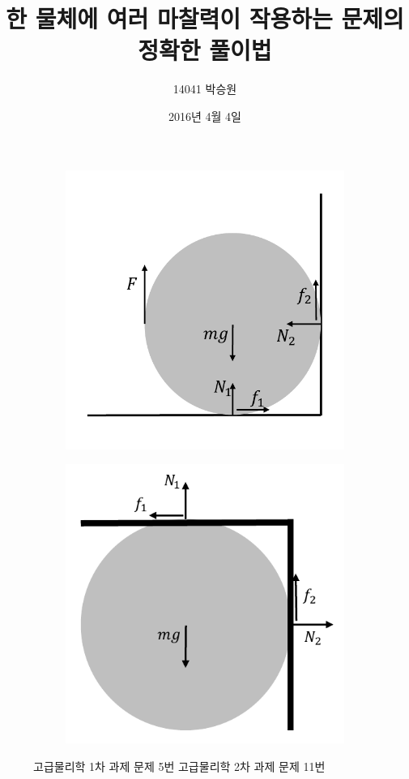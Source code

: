 \documentclass[11pt]{article}
\title{한 물체에 여러 마찰력이 작용하는 문제의 정확한 풀이법}
\author{14041 박승원}
\date{2016년 4월 4일}
\begin{document}
\maketitle
\begin{figure}[ht]
	\centering
	\begin{subfigure}[t]{.3\linewidth}
		\includegraphics[width=\linewidth]{Fig1.pdf}
		\caption{\label{fig:fig1}}
	\end{subfigure}%
	\begin{subfigure}[t]{.3\linewidth}
		\includegraphics[width=\linewidth]{Fig2.pdf}
		\caption{\label{fig:fig2}}
	\end{subfigure}
	\caption{ 고급물리학 1차 과제 문제 5번  고급물리학 2차 과제 문제 11번}
\end{figure}
\end{document}
